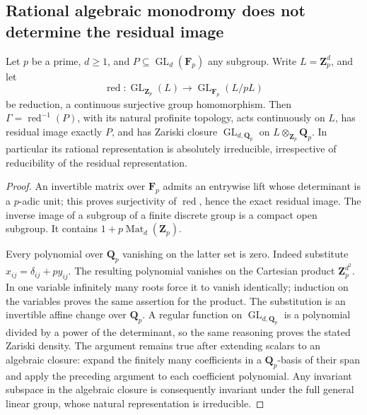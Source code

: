\subsection{Rational algebraic monodromy does not determine the residual image}

\begin{proposition}
\label{prop:root-rational-residual-obstruction}
Let \(p\) be a prime, \(d\ge1\), and
\(P\subseteq\operatorname{GL}_d(\mathbf F_p)\) any subgroup.
Write \(L=\mathbf Z_p^d\), and let
\[
 \operatorname{red}:\operatorname{GL}_{\mathbf Z_p}(L)
       \longrightarrow\operatorname{GL}_{\mathbf F_p}(L/pL)
\]
be reduction, a continuous surjective group homomorphism. Then
\(\Gamma=\operatorname{red}^{-1}(P)\), with its natural profinite
topology, acts continuously on \(L\), has residual image exactly
\(P\), and has Zariski closure
\(\operatorname{GL}_{d,\mathbf Q_p}\) on
\(L\otimes_{\mathbf Z_p}\mathbf Q_p\).
In particular its rational representation is absolutely irreducible,
irrespective of reducibility of the residual representation.
\end{proposition}
\begin{proof}
An invertible matrix over \(\mathbf F_p\) admits an entrywise lift
whose determinant is a \(p\)-adic unit; this proves surjectivity of
\(\operatorname{red}\), hence the exact residual image. The inverse
image of a subgroup of a finite discrete group is a compact open
subgroup. It contains \(1+p\operatorname{Mat}_d(\mathbf Z_p)\).

Every polynomial over \(\mathbf Q_p\) vanishing on the latter
set is zero. Indeed substitute \(x_{ij}=\delta_{ij}+p y_{ij}\).
The resulting polynomial vanishes on the Cartesian product
\(\mathbf Z_p^{d^2}\). In one variable infinitely many roots force
it to vanish identically; induction on the variables proves the same
assertion for the product. The substitution is an invertible affine
change over \(\mathbf Q_p\). A regular function on
\(\operatorname{GL}_{d,\mathbf Q_p}\) is a polynomial divided by
a power of the determinant, so the same reasoning proves the stated
Zariski density. The argument remains true after extending scalars to
an algebraic closure: expand the finitely many coefficients in a
\(\mathbf Q_p\)-basis of their span and apply the preceding argument
to each coefficient polynomial. Any invariant subspace in the
algebraic closure is consequently invariant under the full general
linear group, whose natural representation is irreducible.
\end{proof}

